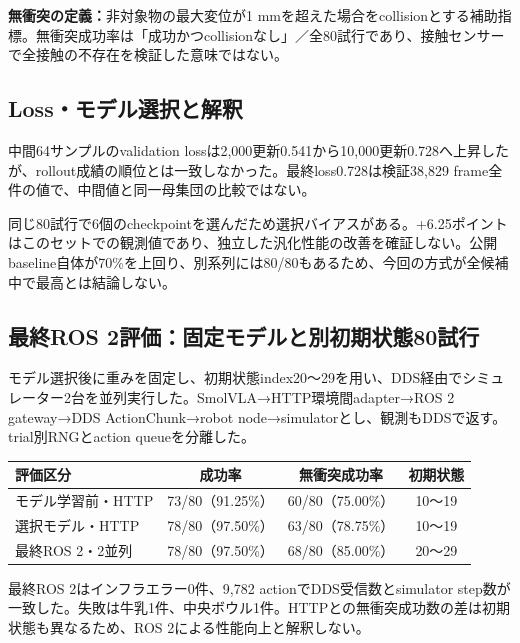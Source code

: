 \documentclass[paper=a4,fontsize=10pt,baselineskip=15pt]{jlreq}
\begin{document}
\textbf{無衝突の定義：}非対象物の最大変位が1 mmを超えた場合をcollisionとする補助指標。無衝突成功率は「成功かつcollisionなし」／全80試行であり、接触センサーで全接触の不存在を検証した意味ではない。
\subsection{Loss・モデル選択と解釈}
中間64サンプルのvalidation lossは2,000更新0.541から10,000更新0.728へ上昇したが、rollout成績の順位とは一致しなかった。最終loss0.728は検証38,829 frame全件の値で、中間値と同一母集団の比較ではない。

同じ80試行で6個のcheckpointを選んだため選択バイアスがある。+6.25ポイントはこのセットでの観測値であり、独立した汎化性能の改善を確証しない。公開baseline自体が70\%を上回り、別系列には80/80もあるため、今回の方式が全候補中で最高とは結論しない。
\newpage
\subsection{最終ROS 2評価：固定モデルと別初期状態80試行}
モデル選択後に重みを固定し、初期状態index20〜29を用い、DDS経由でシミュレーター2台を並列実行した。SmolVLA→HTTP環境間adapter→ROS 2 gateway→DDS ActionChunk→robot node→simulatorとし、観測もDDSで返す。trial別RNGとaction queueを分離した。
\begin{center}
\begin{tabular}{@{}lccc@{}}\toprule
評価区分 & 成功率 & 無衝突成功率 & 初期状態\\\midrule
モデル学習前・HTTP & 73/80（91.25\%） & 60/80（75.00\%） & 10〜19\\
選択モデル・HTTP & 78/80（97.50\%） & 63/80（78.75\%） & 10〜19\\
最終ROS 2・2並列 & 78/80（97.50\%） & 68/80（85.00\%） & 20〜29\\\bottomrule
\end{tabular}
\end{center}
最終ROS 2はインフラエラー0件、9,782 actionでDDS受信数とsimulator step数が一致した。失敗は牛乳1件、中央ボウル1件。HTTPとの無衝突成功数の差は初期状態も異なるため、ROS 2による性能向上と解釈しない。
\end{document}
